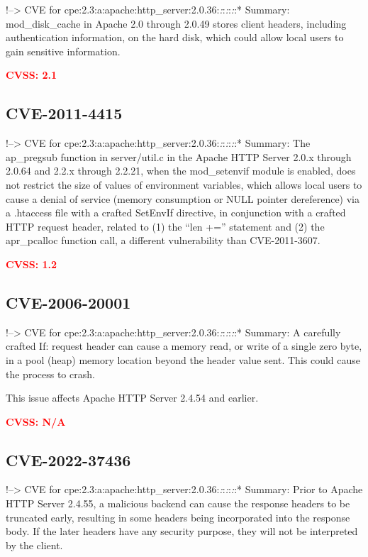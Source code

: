 \documentclass[a4paper, 12pt]{article}
\begin{document}
!--\textgreater{} CVE for
cpe:2.3:a:apache:http\_server:2.0.36:\emph{:}:\emph{:}:\emph{:}:*
Summary: mod\_disk\_cache in Apache 2.0 through 2.0.49 stores client
headers, including authentication information, on the hard disk, which
could allow local users to gain sensitive information.

\textbf{\textcolor{red}{CVSS: 2.1}}

\hypertarget{cve-2011-4415}{%
\subsection{CVE-2011-4415}\label{cve-2011-4415}}

!--\textgreater{} CVE for
cpe:2.3:a:apache:http\_server:2.0.36:\emph{:}:\emph{:}:\emph{:}:*
Summary: The ap\_pregsub function in server/util.c in the Apache HTTP
Server 2.0.x through 2.0.64 and 2.2.x through 2.2.21, when the
mod\_setenvif module is enabled, does not restrict the size of values of
environment variables, which allows local users to cause a denial of
service (memory consumption or NULL pointer dereference) via a .htaccess
file with a crafted SetEnvIf directive, in conjunction with a crafted
HTTP request header, related to (1) the ``len +='' statement and (2) the
apr\_pcalloc function call, a different vulnerability than
CVE-2011-3607.

\textbf{\textcolor{red}{CVSS: 1.2}}

\hypertarget{cve-2006-20001}{%
\subsection{CVE-2006-20001}\label{cve-2006-20001}}

!--\textgreater{} CVE for
cpe:2.3:a:apache:http\_server:2.0.36:\emph{:}:\emph{:}:\emph{:}:*
Summary: A carefully crafted If: request header can cause a memory read,
or write of a single zero byte, in a pool (heap) memory location beyond
the header value sent. This could cause the process to crash.

This issue affects Apache HTTP Server 2.4.54 and earlier.

\textbf{\textcolor{red}{CVSS: N/A}}

\hypertarget{cve-2022-37436}{%
\subsection{CVE-2022-37436}\label{cve-2022-37436}}

!--\textgreater{} CVE for
cpe:2.3:a:apache:http\_server:2.0.36:\emph{:}:\emph{:}:\emph{:}:*
Summary: Prior to Apache HTTP Server 2.4.55, a malicious backend can
cause the response headers to be truncated early, resulting in some
headers being incorporated into the response body. If the later headers
have any security purpose, they will not be interpreted by the client.
\end{document}
